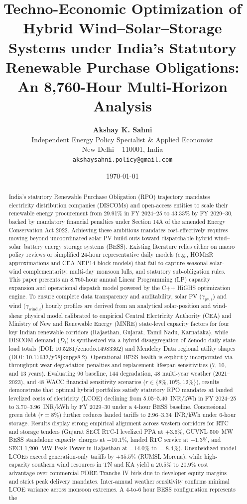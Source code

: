 \documentclass[11pt,a4paper]{article}
\title{\textbf{Techno-Economic Optimization of Hybrid Wind--Solar--Storage Systems under India's Statutory Renewable Purchase Obligations: An 8,760-Hour Multi-Horizon Analysis}}
\author{\textbf{Akshay K. Sahni}\\[0.5em]
\small Independent Energy Policy Specialist \& Applied Economist\\
\small New Delhi -- 110001, India\\
\small \texttt{akshaysahni.policy@gmail.com}}
\date{\today}
\begin{document}
\maketitle

\begin{abstract}
India's statutory Renewable Purchase Obligation (RPO) trajectory mandates electricity distribution companies (DISCOMs) and open-access entities to scale their renewable energy procurement from 29.91\% in FY 2024--25 to 43.33\% by FY 2029--30, backed by mandatory financial penalties under Section 14A of the amended Energy Conservation Act 2022. Achieving these ambitious mandates cost-effectively requires moving beyond uncoordinated solar PV build-outs toward dispatchable hybrid wind--solar--battery energy storage systems (BESS). Existing literature relies either on macro policy reviews or simplified 24-hour representative daily models (e.g., HOMER approximations and CEA NEP14 block models) that fail to capture seasonal solar-wind complementarity, multi-day monsoon lulls, and statutory sub-obligation rules. This paper presents an 8,760-hour annual Linear Programming (LP) capacity expansion and operational dispatch model powered by the C++ HiGHS optimization engine. To ensure complete data transparency and auditability, solar PV ($\gamma_{\text{pv},t}$) and wind ($\gamma_{\text{wind},t}$) hourly profiles are derived from an analytical solar-position and wind-shear physical model calibrated to empirical Central Electricity Authority (CEA) and Ministry of New and Renewable Energy (MNRE) state-level capacity factors for four key Indian renewable corridors (Rajasthan, Gujarat, Tamil Nadu, Karnataka), while DISCOM demand ($D_t$) is synthesized via a hybrid disaggregation of Zenodo daily state load totals (\textsf{DOI: 10.5281/zenodo.14983362}) and Mendeley Data regional utility shapes (\textsf{DOI: 10.17632/y58jknpgs8.2}). Operational BESS health is explicitly incorporated via throughput wear degradation penalties and replacement lifespan sensitivities (7, 10, and 13 years). Evaluating 96 baseline, 144 degradation, 48 multi-year weather (2021--2023), and 48 WACC financial sensitivity scenarios ($r \in \{8\%, 10\%, 12\%\}$), results demonstrate that optimal hybrid portfolios satisfy statutory RPO mandates at landed levelized costs of electricity (LCOE) declining from 5.05--5.40~INR/kWh in FY 2024--25 to 3.70--3.96~INR/kWh by FY 2029--30 under a 4-hour BESS baseline. Concessional green debt ($r = 8\%$) further reduces landed tariffs to 2.96--3.34~INR/kWh under 6-hour storage. Results display strong empirical alignment across western corridors for RTC and storage tenders (Gujarat SECI RTC-I levelized PPA at $+3.6\%$, GUVNL 500~MW BESS standalone capacity charges at $-10.1\%$, landed RTC service at $-1.3\%$, and SECI 1,200~MW Peak Power in Rajasthan at $-14.0\%\text{ to }-8.4\%$). Unsubsidized model LCOEs exceed generation-only tariffs by $+35.5\%$ (RUMSL Morena), while high-capacity southern wind resources in TN and KA yield a $20.5\%\text{ to }20.9\%$ cost advantage over commercial FDRE Tranche IV bids due to developer equity margins and strict peak delivery mandates. Inter-annual weather sensitivity confirms minimal LCOE variance across monsoon extremes. A 4-to-6 hour BESS configuration represents the 
\end{abstract}
\end{document}
